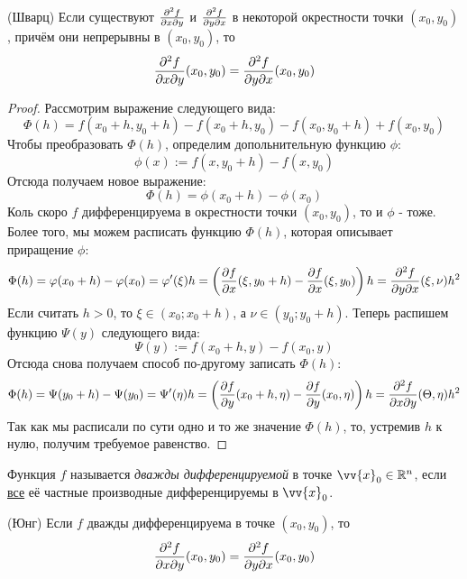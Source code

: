 \begin{theorem} (Шварц)
	Если существуют $\frac{\partial^2 f}{\partial x \partial y}$ и $\frac{\partial^2 f}{\partial y \partial x}$ в некоторой окрестности точки $(x_0, y_0)$, причём они непрерывны в $(x_0, y_0)$, то
	\[
		\frac{\partial^2 f}{\partial x \partial y} (x_0, y_0) = \frac{\partial^2 f}{\partial y \partial x} (x_0, y_0)
	\]
\end{theorem}

\begin{proof}
	Рассмотрим выражение следующего вида:
	\[
		\Phi (h) = f(x_0 + h, y_0 + h) - f(x_0 + h, y_0) - f(x_0, y_0 + h) + f(x_0, y_0)
	\]
	Чтобы преобразовать $\Phi(h)$, определим допольнительную функцию $\phi$:
	\[
		\phi(x) := f(x, y_0 + h) - f(x, y_0)
	\]
	Отсюда получаем новое выражение:
	\[
		\Phi(h) = \phi(x_0 + h) - \phi(x_0)
	\]
	Коль скоро $f$ дифференцируема в окрестности точки $(x_0, y_0)$, то и $\phi$ - тоже. Более того, мы можем расписать функцию $\Phi(h)$, которая описывает приращение $\phi$:
	\[
		\Phi(h) = \varphi(x_0 + h) - \varphi(x_0) = \varphi'(\xi) h = \left(\frac{\partial f}{\partial x} (\xi, y_0 + h) - \frac{\partial f}{\partial x} (\xi, y_0)\right) h = \frac{\partial^2 f}{\partial y \partial x} (\xi, \nu) h^2
	\]
	Если считать $h > 0$, то $\xi \in (x_0; x_0 + h)$, а $\nu \in (y_0; y_0 + h)$. Теперь распишем функцию $\Psi(y)$ следующего вида:
	\[
		\Psi(y) := f(x_0 + h, y) - f(x_0, y)
	\]
	Отсюда снова получаем способ по-другому записать $\Phi(h)$:
	\[
		\Phi(h) = \Psi(y_0 + h) - \Psi(y_0) = \Psi'(\eta) h = \left(\frac{\partial f}{\partial y} (x_0 + h, \eta) - \frac{\partial f}{\partial y} (x_0, \eta)\right) h = \frac{\partial^2 f}{\partial x \partial y} (\Theta, \eta) h^2
	\]
	Так как мы расписали по сути одно и то же значение $\Phi(h)$, то, устремив $h$ к нулю, получим требуемое равенство.
\end{proof}

\begin{definition}
	Функция $f$ называется \textit{дважды дифференцируемой} в точке $\vv{x}_0 \in \R^n$, если \underline{все} её частные производные дифференцируемы в $\vv{x}_0$.
\end{definition}

\begin{theorem} (Юнг)
	Если $f$ дважды дифференцируема в точке $(x_0, y_0)$, то
	\[
		\frac{\partial^2 f}{\partial x \partial y} (x_0, y_0) = \frac{\partial^2 f}{\partial y \partial x} (x_0, y_0)
	\]
\end{theorem}

